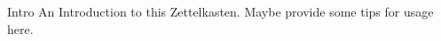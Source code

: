 \documentclass[class=article, crop=false]{standalone}
\begin{document}
\begin{zettel}{Intro}
    An Introduction to this Zettelkasten. Maybe provide some tips for usage here.
\end{zettel}
\end{document}
